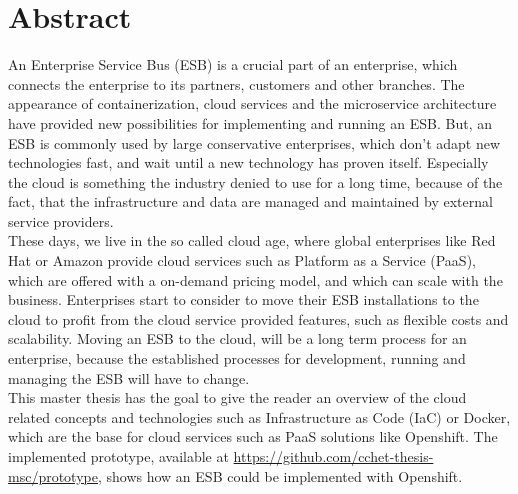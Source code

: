 \chapter{Abstract}
An Enterprise Service Bus (ESB) is a crucial part of an enterprise, which connects the enterprise to its partners, customers and other branches. The appearance of containerization, cloud services and the microservice architecture have provided new possibilities for implementing and running an ESB. But, an ESB is commonly used by large conservative enterprises, which don't adapt new technologies fast, and wait until a new technology has proven itself. Especially the cloud is something the industry denied to use for a long time, because of the fact, that the infrastructure and data are managed and maintained by external service providers. \\ 

These days, we live in the so called cloud age, where global enterprises like Red Hat or Amazon provide cloud services such as Platform as a Service (PaaS), which are offered with a on-demand pricing model, and which can scale with the business. Enterprises start to consider to move their ESB installations to the cloud to profit from the cloud service provided features, such as flexible costs and scalability. Moving an ESB to the cloud, will be a long term process for an enterprise, because the established processes for development, running and managing the ESB will have to change. \\

This master thesis has the goal to give the reader an overview of the cloud related concepts and technologies such as Infrastructure as Code (IaC) or Docker, which are the base for cloud services such as PaaS solutions like Openshift. The implemented prototype, available at \url{https://github.com/cchet-thesis-msc/prototype}, shows how an ESB could be implemented with Openshift. \\



